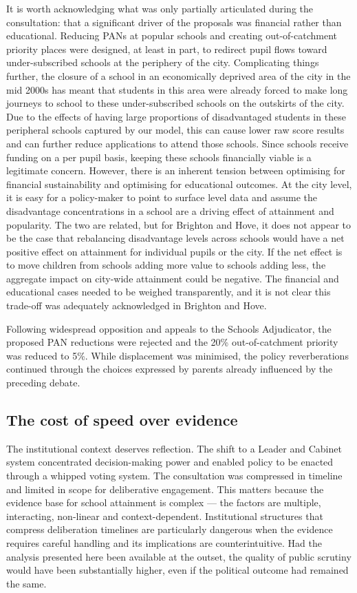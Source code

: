 \documentclass[
  12pt,
  titlepage]{article}
\begin{document}
It is worth acknowledging what was only partially articulated during the
consultation: that a significant driver of the proposals was financial
rather than educational. Reducing PANs at popular schools and creating
out-of-catchment priority places were designed, at least in part, to
redirect pupil flows toward under-subscribed schools at the periphery of
the city. Complicating things further, the closure of a school in an
economically deprived area of the city in the mid 2000s has meant that
students in this area were already forced to make long journeys to
school to these under-subscribed schools on the outskirts of the city.
Due to the effects of having large proportions of disadvantaged students
in these peripheral schools captured by our model, this can cause lower
raw score results and can further reduce applications to attend those
schools. Since schools receive funding on a per pupil basis, keeping
these schools financially viable is a legitimate concern. However, there
is an inherent tension between optimising for financial sustainability
and optimising for educational outcomes. At the city level, it is easy
for a policy-maker to point to surface level data and assume the
disadvantage concentrations in a school are a driving effect of
attainment and popularity. The two are related, but for Brighton and
Hove, it does not appear to be the case that rebalancing disadvantage
levels across schools would have a net positive effect on attainment for
individual pupils or the city. If the net effect is to move children
from schools adding more value to schools adding less, the aggregate
impact on city-wide attainment could be negative. The financial and
educational cases needed to be weighed transparently, and it is not
clear this trade-off was adequately acknowledged in Brighton and Hove.

Following widespread opposition and appeals to the Schools Adjudicator,
the proposed PAN reductions were rejected and the 20\% out-of-catchment
priority was reduced to 5\%. While displacement was minimised, the
policy reverberations continued through the choices expressed by parents
already influenced by the preceding debate.

\subsection{The cost of speed over
evidence}\label{the-cost-of-speed-over-evidence}

The institutional context deserves reflection. The shift to a Leader and
Cabinet system concentrated decision-making power and enabled policy to
be enacted through a whipped voting system. The consultation was
compressed in timeline and limited in scope for deliberative engagement.
This matters because the evidence base for school attainment is complex
--- the factors are multiple, interacting, non-linear and
context-dependent. Institutional structures that compress deliberation
timelines are particularly dangerous when the evidence requires careful
handling and its implications are counterintuitive. Had the analysis
presented here been available at the outset, the quality of public
scrutiny would have been substantially higher, even if the political
outcome had remained the same.
\end{document}
